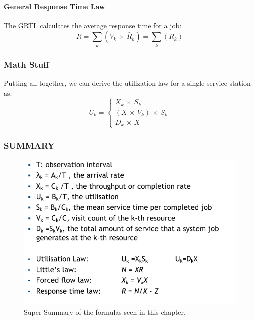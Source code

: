 \documentclass[10pt,a4paper]{article}
\begin{document}
				\paragraph{General Response Time Law}
					The GRTL calculates the average response time for a job:
					\begin{equation}
						R = \sum_k (V_k \,\times\, \tilde{R_k}) = \sum_k (R_k)
					\end{equation}
					
				\subsubsection{Math Stuff}
					Putting all together, we can derive the utilization law for a single service station as:
					\begin{equation}
						U_k = 
						\begin{cases}
							X_k \,\times\, S_k \\
							(X \,\times\, V_k) \,\times\,S_k \\
							D_k \,\times\, X
						\end{cases}
					\end{equation}
					
				\subsubsection{SUMMARY}
					\begin{figure}
						\centering
						\includegraphics[width = \textwidth]{./images/superSummary1.png}
						\caption{Super Summary of the formulas seen in this chapter.}
					\end{figure}
					
\end{document}
